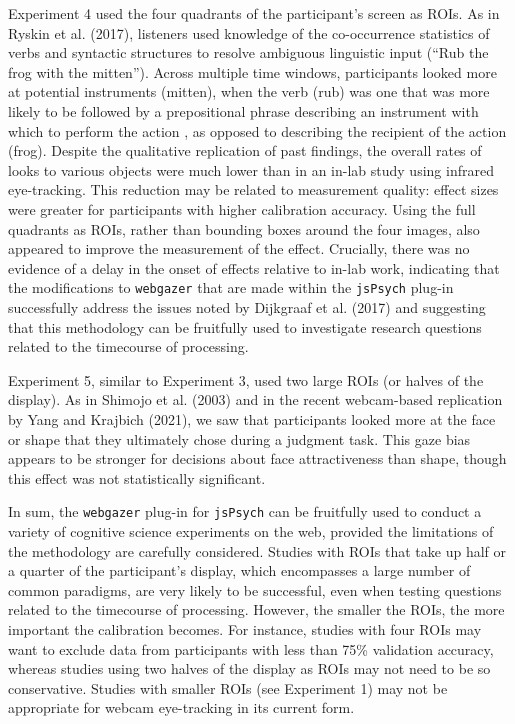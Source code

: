 \documentclass[
  man,floatsintext]{apa6}
\begin{document}
Experiment 4 used the four quadrants of the participant's screen as ROIs. As in Ryskin et al. (2017), listeners used knowledge of the co-occurrence statistics of verbs and syntactic structures to resolve ambiguous linguistic input (``Rub the frog with the mitten''). Across multiple time windows, participants looked more at potential instruments (mitten), when the verb (rub) was one that was more likely to be followed by a prepositional phrase describing an instrument with which to perform the action , as opposed to describing the recipient of the action (frog). Despite the qualitative replication of past findings, the overall rates of looks to various objects were much lower than in an in-lab study using infrared eye-tracking. This reduction may be related to measurement quality: effect sizes were greater for participants with higher calibration accuracy. Using the full quadrants as ROIs, rather than bounding boxes around the four images, also appeared to improve the measurement of the effect. Crucially, there was no evidence of a delay in the onset of effects relative to in-lab work, indicating that the modifications to \texttt{webgazer} that are made within the \texttt{jsPsych} plug-in successfully address the issues noted by Dijkgraaf et al. (2017) and suggesting that this methodology can be fruitfully used to investigate research questions related to the timecourse of processing.

Experiment 5, similar to Experiment 3, used two large ROIs (or halves of the display). As in Shimojo et al. (2003) and in the recent webcam-based replication by Yang and Krajbich (2021), we saw that participants looked more at the face or shape that they ultimately chose during a judgment task. This gaze bias appears to be stronger for decisions about face attractiveness than shape, though this effect was not statistically significant.

In sum, the \texttt{webgazer} plug-in for \texttt{jsPsych} can be fruitfully used to conduct a variety of cognitive science experiments on the web, provided the limitations of the methodology are carefully considered. Studies with ROIs that take up half or a quarter of the participant's display, which encompasses a large number of common paradigms, are very likely to be successful, even when testing questions related to the timecourse of processing. However, the smaller the ROIs, the more important the calibration becomes. For instance, studies with four ROIs may want to exclude data from participants with less than 75\% validation accuracy, whereas studies using two halves of the display as ROIs may not need to be so conservative. Studies with smaller ROIs (see Experiment 1) may not be appropriate for webcam eye-tracking in its current form.
\end{document}
